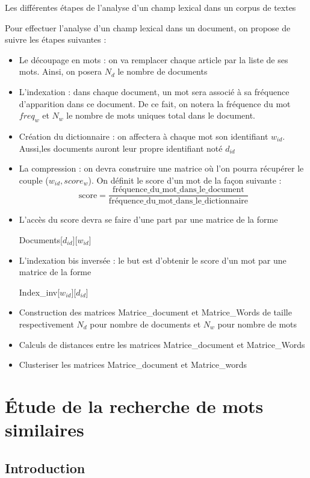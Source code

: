 \documentclass[a4paper,10pt]{article}
\begin{document}
Les différentes \'etapes de l’analyse d’un champ lexical
dans un corpus de textes

Pour effectuer l’analyse d’un champ lexical dans un
document, on propose de suivre les étapes suivantes :

\begin{itemize}
\item Le découpage en mots : on va remplacer chaque article
par la liste de ses mots.
Ainsi, on posera $N_d$ le nombre de documents
\item L’indexation : dans chaque document,
un mot sera associé à sa fréquence d’apparition dans ce document.
De ce fait, on notera la fréquence du mot $freq_w$ et $N_w$
le nombre de mots uniques total dans le document.
\item Création du dictionnaire :
on affectera à chaque mot son identifiant $w_{id}$.
Aussi,les documents auront leur propre identifiant noté $d_{id}$
\item La compression : on devra construire une matrice où
l’on pourra récupérer le couple ($w_{id}, score_w$).
On définit le score d’un mot de la façon suivante :
$$
\mbox{score} = \frac
{\mbox{fr\'equence\_du\_mot\_dans\_le\_document}}
{\mbox{fr\'equence\_du\_mot\_dans\_le\_dictionnaire}}
$$
\item L’accès du score devra se faire d’une part par une
matrice de la forme

Documents[$d_{id}$][$w_{id}$]
\item L’indexation bis inversée :
le but est d’obtenir le score d’un mot par une matrice de la forme

Index\_inv[$w_{id}$][$d_{id}$]
\item Construction des matrices Matrice\_document et
Matrice\_Words de taille respectivement $N_d$
pour nombre de documents et $N_w$ pour nombre de mots
\item Calculs de distances entre les matrices Matrice\_document
et Matrice\_Words
\item Clusteriser les matrices Matrice\_document et Matrice\_words
\end{itemize}

\section{\'Etude de la recherche de mots similaires}
\subsection*{Introduction}
\end{document}
